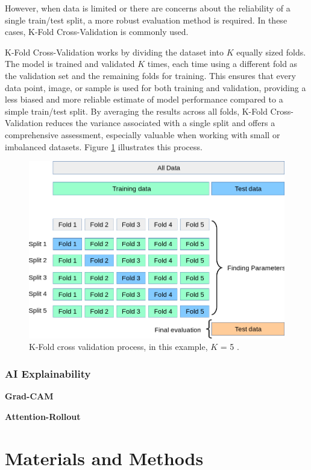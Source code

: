 \documentclass[a4paper,10pt]{book}
\begin{document}
However, when data is limited or there are concerns about the reliability of a single train/test split, a more robust evaluation method is required. In these cases, K-Fold Cross-Validation is commonly used.

K-Fold Cross-Validation works by dividing the dataset into $K$ equally sized folds. The model is trained and validated $K$ times, each time using a different fold as the validation set and the remaining folds for training. This ensures that every data point, image, or sample is used for both training and validation, providing a less biased and more reliable estimate of model performance compared to a simple train/test split. By averaging the results across all folds, K-Fold Cross-Validation reduces the variance associated with a single split and offers a comprehensive assessment, especially valuable when working with small or imbalanced datasets. Figure \ref{fig:k_fold} illustrates this process.

\begin{figure}[h!]
    \centering
    \includegraphics[width=0.75\linewidth]{reports//assets/k-fold.png}
    \caption[K-Fold Cross Validation]{K-Fold cross validation process, in this example, $K$ = 5 \cite{noauthor_31_nodate}.}
    \label{fig:k_fold}
\end{figure}

\subsection{AI Explainability}

\textbf{Grad-CAM}

\textbf{Attention-Rollout}

\chapter{Materials and Methods}
\end{document}
